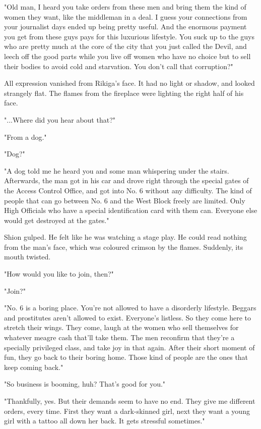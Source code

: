 "Old man, I heard you take orders from these men and bring them the kind
of women they want, like the middleman in a deal. I guess your
connections from your journalist days ended up being pretty useful. And
the enormous payment you get from these guys pays for this luxurious
lifestyle. You suck up to the guys who are pretty much at the core of
the city that you just called the Devil, and leech off the good parts
while you live off women who have no choice but to sell their bodies to
avoid cold and starvation. You don't call that corruption?"

All expression vanished from Rikiga's face. It had no light or shadow,
and looked strangely flat. The flames from the fireplace were lighting
the right half of his face.

"...Where did you hear about that?"

"From a dog."

"Dog?"

"A dog told me he heard you and some man whispering under the stairs.
Afterwards, the man got in his car and drove right through the special
gates of the Access Control Office, and got into No. 6 without any
difficulty. The kind of people that can go between No. 6 and the West
Block freely are limited. Only High Officials who have a special
identification card with them can. Everyone else would get destroyed at
the gates."

Shion gulped. He felt like he was watching a stage play. He could read
nothing from the man's face, which was coloured crimson by the flames.
Suddenly, its mouth twisted.

"How would you like to join, then?"

"Join?"

"No. 6 is a boring place. You're not allowed to have a disorderly
lifestyle. Beggars and prostitutes aren't allowed to exist. Everyone's
listless. So they come here to stretch their wings. They come, laugh at
the women who sell themselves for whatever meagre cash that'll take
them. The men reconfirm that they're a specially privileged class, and
take joy in that again. After their short moment of fun, they go back to
their boring home. Those kind of people are the ones that keep coming
back."

"So business is booming, huh? That's good for you."

"Thankfully, yes. But their demands seem to have no end. They give me
different orders, every time. First they want a dark-skinned girl, next
they want a young girl with a tattoo all down her back. It gets
stressful sometimes."

